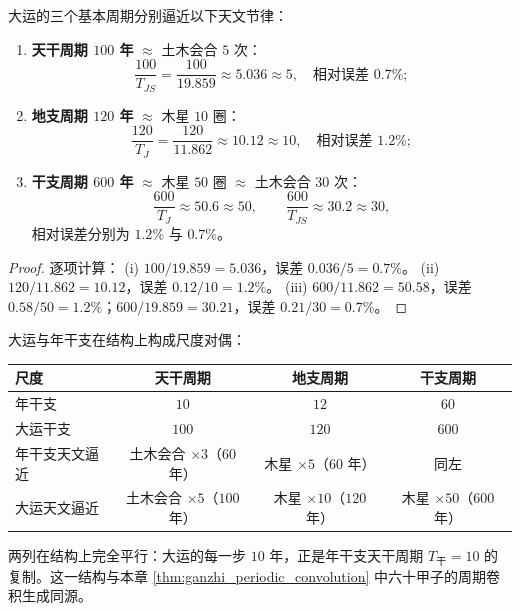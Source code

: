 \begin{corollary}[大运的三重天文逼近]\label{cor:dayun_triple_approximation_yijing}
大运的三个基本周期分别逼近以下天文节律：
\begin{enumerate}[label=(\roman*)]
    \item \textbf{天干周期 $100$ 年} $\approx$ 土木会合 $5$ 次：
    \[
    \frac{100}{T_{JS}}=\frac{100}{19.859}\approx 5.036\approx 5,\quad\text{相对误差 }0.7\%;
    \]
    \item \textbf{地支周期 $120$ 年} $\approx$ 木星 $10$ 圈：
    \[
    \frac{120}{T_J}=\frac{120}{11.862}\approx 10.12\approx 10,\quad\text{相对误差 }1.2\%;
    \]
    \item \textbf{干支周期 $600$ 年} $\approx$ 木星 $50$ 圈 $\approx$ 土木会合 $30$ 次：
    \[
    \frac{600}{T_J}\approx 50.6\approx 50,\qquad \frac{600}{T_{JS}}\approx 30.2\approx 30,
    \]
    相对误差分别为 $1.2\%$ 与 $0.7\%$。
\end{enumerate}
\end{corollary}

\begin{proof}
逐项计算：
(i) $100/19.859=5.036$，误差 $0.036/5=0.7\%$。
(ii) $120/11.862=10.12$，误差 $0.12/10=1.2\%$。
(iii) $600/11.862=50.58$，误差 $0.58/50=1.2\%$；$600/19.859=30.21$，误差 $0.21/30=0.7\%$。
\end{proof}

\begin{theorem}[大运与年干支的尺度对偶]\label{thm:dayun_vs_year_ganzhi_yijing}
大运与年干支在结构上构成尺度对偶：
\begin{center}
\small
\begin{tabular}{@{}lccc@{}}
\toprule
尺度 & 天干周期 & 地支周期 & 干支周期 \\
\midrule
年干支 & $10$ & $12$ & $60$ \\
大运干支 & $100$ & $120$ & $600$ \\
\midrule
年干支天文逼近 & 土木会合 $\times 3$（$60$ 年） & 木星 $\times 5$（$60$ 年） & 同左 \\
大运天文逼近 & 土木会合 $\times 5$（$100$ 年） & 木星 $\times 10$（$120$ 年） & 木星 $\times 50$（$600$ 年） \\
\bottomrule
\end{tabular}
\end{center}
两列在结构上完全平行：大运的每一步 $10$ 年，正是年干支天干周期 $T_{\text{干}}=10$ 的复制。这一结构与本章 \cref{thm:ganzhi_periodic_convolution} 中六十甲子的周期卷积生成同源。
\end{theorem}

